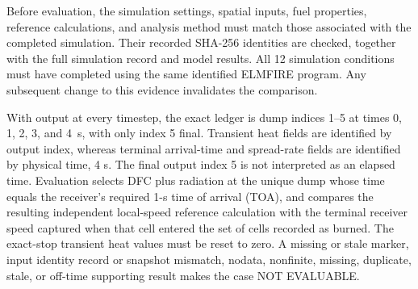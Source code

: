Before evaluation, the simulation settings, spatial inputs, fuel properties,
reference calculations, and analysis method must match those associated with
the completed simulation. Their recorded SHA-256 identities are checked,
together with the full simulation record and model results. All 12 simulation
conditions must have completed using the same identified ELMFIRE program.
Any subsequent change to this evidence invalidates the comparison.

With output at every timestep, the exact ledger is dump indices 1--5 at
times 0, 1, 2, 3, and 4~s, with only index 5 final. Transient heat fields
are identified by output index, whereas terminal arrival-time and spread-rate
fields are identified by physical time, 4 s. The final output index 5 is not
interpreted as an elapsed time. Evaluation selects DFC plus radiation at the unique
dump whose time equals the receiver's required 1-s time of arrival (TOA), and compares the
resulting independent local-speed reference calculation with the terminal receiver speed
captured when that cell entered the set of cells recorded as burned.  The exact-stop transient
heat values must be reset to zero.  A missing or stale marker, input identity record or
snapshot mismatch, nodata, nonfinite, missing, duplicate, stale, or off-time
supporting result makes the case NOT EVALUABLE.

